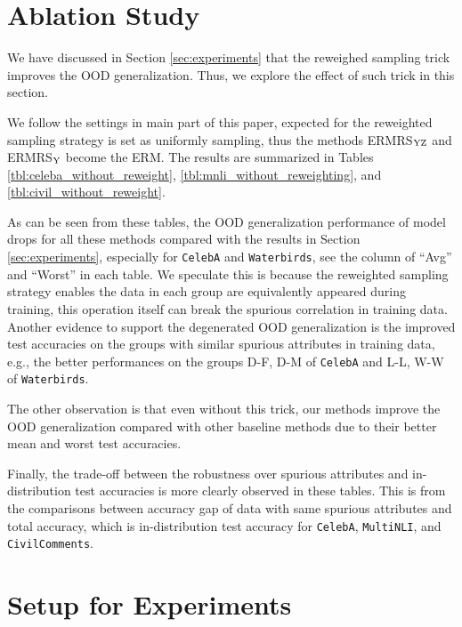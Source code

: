 \section{Ablation Study}\label{app:experiments without reweighting}
We have discussed in Section \ref{sec:experiments} that the reweighed sampling trick improves the OOD generalization. Thus, we explore the effect of such trick in this section. 
\par
We follow the settings in main part of this paper, expected for the reweighted sampling strategy is set as uniformly sampling, thus the methods ERMRS$_{\rm YZ}$ and ERMRS$_{\rm Y}$ become the ERM. The results are summarized in Tables \ref{tbl:celeba_without_reweight}, \ref{tbl:mnli_without_reweighting}, and \ref{tbl:civil_without_reweight}.    
\par
As can be seen from these tables, the OOD generalization performance of model drops for all these methods compared with the results in Section \ref{sec:experiments}, especially for \texttt{CelebA} and \texttt{Waterbirds}, see the column of ``Avg'' and ``Worst'' in each table. We speculate this is because the reweighted sampling strategy enables the data in each group are equivalently appeared during training, this operation itself can break the spurious correlation in training data. Another evidence to support the degenerated OOD generalization is the improved test accuracies on the groups with similar spurious attributes in training data, e.g., the better performances on the groups D-F, D-M of \texttt{CelebA} and L-L, W-W of \texttt{Waterbirds}.
\par
The other observation is that even without this trick, our methods improve the OOD generalization compared with other baseline methods due to their better mean and worst test accuracies.
\par
Finally, the trade-off between the robustness over spurious attributes and in-distribution test accuracies is more clearly observed in these tables. This is from the comparisons between accuracy gap of data with same spurious attributes and total accuracy, which is in-distribution test accuracy for \texttt{CelebA}, \texttt{MultiNLI}, and \texttt{CivilComments}.     
\section{Setup for Experiments}
